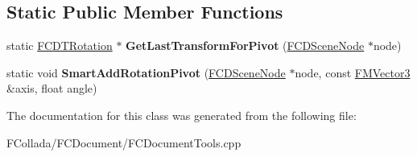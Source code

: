 \subsection*{Static Public Member Functions}
\begin{DoxyCompactItemize}
\item 
\hypertarget{classFCDocumentTools_1_1FCDConversionSwapFunctor_a9489874fd8ea50f164ad706c0359b366}{
static \hyperlink{classFCDTRotation}{FCDTRotation} $\ast$ {\bfseries GetLastTransformForPivot} (\hyperlink{classFCDSceneNode}{FCDSceneNode} $\ast$node)}
\label{classFCDocumentTools_1_1FCDConversionSwapFunctor_a9489874fd8ea50f164ad706c0359b366}

\item 
\hypertarget{classFCDocumentTools_1_1FCDConversionSwapFunctor_a85fdfa24778d6eca385905c2b72a78ca}{
static void {\bfseries SmartAddRotationPivot} (\hyperlink{classFCDSceneNode}{FCDSceneNode} $\ast$node, const \hyperlink{classFMVector3}{FMVector3} \&axis, float angle)}
\label{classFCDocumentTools_1_1FCDConversionSwapFunctor_a85fdfa24778d6eca385905c2b72a78ca}

\end{DoxyCompactItemize}


The documentation for this class was generated from the following file:\begin{DoxyCompactItemize}
\item 
FCollada/FCDocument/FCDocumentTools.cpp\end{DoxyCompactItemize}
